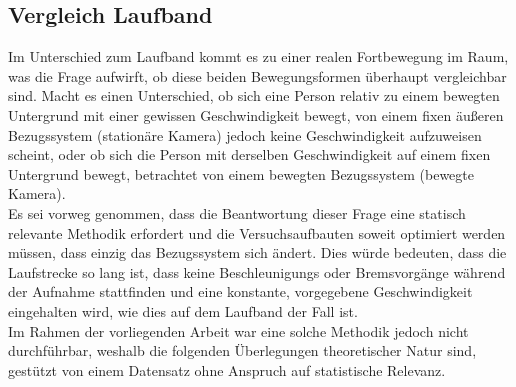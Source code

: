 \subsection{Vergleich Laufband}
Im Unterschied zum Laufband kommt es zu einer realen Fortbewegung im Raum, was die Frage aufwirft, ob diese beiden Bewegungsformen überhaupt vergleichbar sind. Macht es einen Unterschied, ob sich eine Person relativ zu einem bewegten Untergrund mit einer gewissen Geschwindigkeit bewegt, von einem fixen äußeren Bezugssystem (stationäre Kamera) jedoch keine Geschwindigkeit aufzuweisen scheint, oder ob sich die Person mit derselben Geschwindigkeit auf einem fixen Untergrund bewegt, betrachtet von einem bewegten Bezugssystem (bewegte Kamera).\\
Es sei vorweg genommen, dass die Beantwortung dieser Frage eine statisch relevante Methodik erfordert und die Versuchsaufbauten soweit optimiert werden müssen, dass einzig das Bezugssystem sich ändert. Dies würde bedeuten, dass die Laufstrecke so lang ist, dass keine Beschleunigungs oder Bremsvorgänge während der Aufnahme stattfinden und eine konstante, vorgegebene Geschwindigkeit eingehalten wird, wie dies auf dem Laufband der Fall ist.\\
Im Rahmen der vorliegenden Arbeit war eine solche Methodik jedoch nicht durchführbar, weshalb die folgenden Überlegungen theoretischer Natur sind, gestützt von einem Datensatz ohne Anspruch auf statistische Relevanz. 






